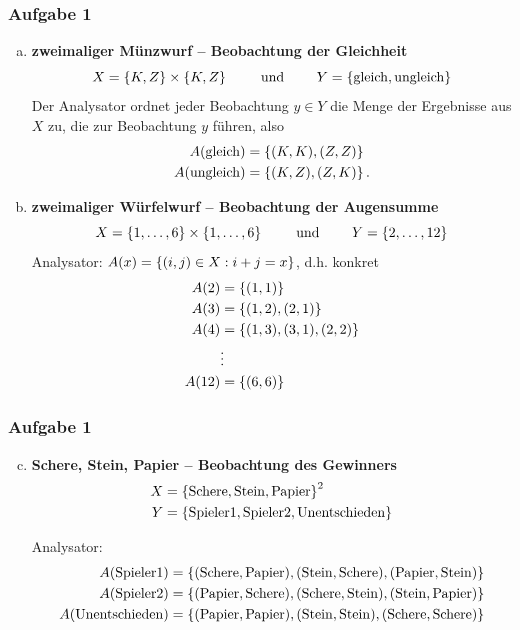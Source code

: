 \documentclass{beamer}
\DeclareMathOperator{\schere}{Schere}
\DeclareMathOperator{\stein}{Stein}
\DeclareMathOperator{\papier}{Papier}
\begin{document}
\begin{frame} \frametitle{Aufgabe 1}
	\footnotesize
	\begin{enumerate}[(a)]
		\item \textbf{zweimaliger Münzwurf -- Beobachtung der Gleichheit}
		\begin{equation*}
			X = \left\{ K,Z \right\} \times \left\{ K,Z \right\} \qquad \text{ und } \qquad
			Y = \left\{ \operatorname{gleich}, \operatorname{ungleich} \right\} 
		\end{equation*}
		\pause
		Der Analysator ordnet jeder Beobachtung $y \in Y$ die Menge der Ergebnisse aus $X$ zu, die zur Beobachtung $y$ führen, also
		\begin{align*}
			A(\operatorname{gleich}) &= \left\{ (K,K), (Z,Z) \right\} \\
			A(\operatorname{ungleich}) &= \left\{ (K,Z), (Z,K) \right\}.			
		\end{align*}
		\pause
		\item \textbf{zweimaliger Würfelwurf -- Beobachtung der Augensumme}
		\begin{equation*}
			X = \left\{ 1, \dots, 6 \right\} \times \left\{ 1, \dots, 6 \right\}
			\qquad \text{ und } \qquad
			Y = \left\{ 2, \dots, 12 \right\} 
		\end{equation*}
		\pause
		Analysator: $A(x) = \left\{ (i,j) \in X : i + j = x \right\}$, d.h. konkret
		\begin{align*}
			A(2) &= \left\{ (1,1) \right\} \\
			A(3) &= \left\{ (1,2), (2,1) \right\} \\
			A(4) &= \left\{ (1,3), (3,1), (2,2) \right\} \\
			&\vdots \\
			A(12) &= \left\{ (6,6) \right\}			
		\end{align*}
	\end{enumerate}
\end{frame}

\begin{frame} \frametitle{Aufgabe 1}
	\footnotesize
	\begin{enumerate}[(a)]
		\setcounter{enumi}{2}
		\item \textbf{Schere, Stein, Papier -- Beobachtung des Gewinners}
		\begin{align*}
			X &= \left\{ \operatorname{Schere}, \operatorname{Stein}, \operatorname{Papier} \right\}^2 \\
			Y &= \left\{ \operatorname{Spieler1}, \operatorname{Spieler2}, \operatorname{Unentschieden} \right\} 
		\end{align*}
		\pause
		
		Analysator:
		\begin{align*}
			A(\operatorname{Spieler1}) &= \menge{(\schere, \papier), (\stein, \schere), (\papier, \stein)} \\
			A(\operatorname{Spieler2}) &= \menge{(\papier, \schere), (\schere, \stein), (\stein, \papier)} \\
			A(\operatorname{Unentschieden}) &= \menge{(\papier, \papier), (\stein, \stein), (\schere, \schere)}		
		\end{align*}
	\end{enumerate}
\end{frame}
\end{document}
